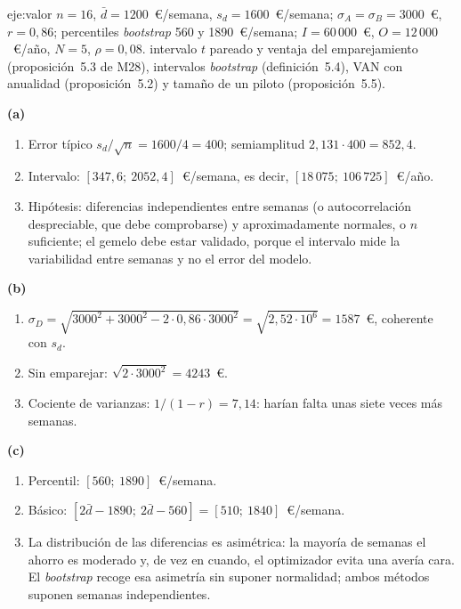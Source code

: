 \begin{solucion}{eje:valor}
\datos $n=16$, $\bar d=1200$~€/semana, $s_d=1600$~€/semana; $\sigma_A=\sigma_B=3000$~€, $r=0{,}86$; percentiles \emph{bootstrap} 560 y 1890~€/semana; $I=60\,000$~€, $O=12\,000$~€/año, $N=5$, $\rho=0{,}08$.
\planteamiento intervalo $t$ pareado y ventaja del emparejamiento (proposición~5.3 de M28), intervalos \emph{bootstrap} (definición~5.4), VAN con anualidad (proposición~5.2) y tamaño de un piloto (proposición~5.5).
\pasos

\noindent\textbf{(a)}
\begin{enumerate}[label=\arabic*.]
  \item Error típico $s_d/\sqrt n=1600/4=400$; semiamplitud $2{,}131\cdot 400=852{,}4$.
  \item Intervalo: $[347{,}6;\ 2052{,}4]$~€/semana, es decir, $[18\,075;\ 106\,725]$~€/año.
  \item Hipótesis: diferencias independientes entre semanas (o autocorrelación despreciable, que debe comprobarse) y aproximadamente normales, o $n$ suficiente; el gemelo debe estar validado, porque el intervalo mide la variabilidad entre semanas y no el error del modelo.
\end{enumerate}

\noindent\textbf{(b)}
\begin{enumerate}[label=\arabic*.]
  \item $\sigma_D=\sqrt{3000^{2}+3000^{2}-2\cdot 0{,}86\cdot 3000^{2}}=\sqrt{2{,}52\cdot 10^{6}}=1587$~€, coherente con $s_d$.
  \item Sin emparejar: $\sqrt{2\cdot 3000^{2}}=4243$~€.
  \item Cociente de varianzas: $1/(1-r)=7{,}14$: harían falta unas siete veces más semanas.
\end{enumerate}

\noindent\textbf{(c)}
\begin{enumerate}[label=\arabic*.]
  \item Percentil: $[560;\ 1890]$~€/semana.
  \item Básico: $[2\bar d-1890;\ 2\bar d-560]=[510;\ 1840]$~€/semana.
  \item La distribución de las diferencias es asimétrica: la mayoría de semanas el ahorro es moderado y, de vez en cuando, el optimizador evita una avería cara. El \emph{bootstrap} recoge esa asimetría sin suponer normalidad; ambos métodos suponen semanas independientes.
\end{enumerate}


\end{solucion}
